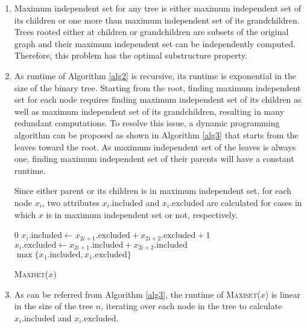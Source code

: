 \begin{enumerate}[label=(\alph*)]
\item Maximum independent set for any tree is either maximum independent set of its children or one more than maximum independent set of its grandchildren.
Trees rooted either at children or grandchildren are subsets of the original graph and their maximum independent set can be independently computed.
Therefore, this problem has the optimal substructure property.

\item As runtime of Algorithm \ref{alg2} is recursive, its runtime is exponential in the size of the binary tree.
Starting from the root, finding maximum independent set for each node requires finding maximum independent set of its children as well as maximum independent set of its grandchildren, resulting in many redundant computations.
To resolve this issue, a dynamic programming algorithm can be proposed as shown in Algorithm \ref{alg3} that starts from the leaves toward the root.
As maximum independent set of the leaves is always one, finding maximum independent set of their parents will have a constant runtime.

Since either parent or its children is in maximum independent set, for each node $x_i$, two attributes $x_i.\text{included}$ and $x_i.\text{excluded}$ are calculated for cases in which $x$ is in maximum independent set or not, respectively.

\begin{algorithm}[H]
\begin{algorithmic}[1]
\State \Return $0$
\EndIf
{}
\State $x_i.\text{included} \leftarrow x_{2i+1}.\text{excluded} + x_{2i+2}.\text{excluded} + 1$
\State $x_i.\text{excluded} \leftarrow x_{2i+1}.\text{included} + x_{2i+2}.\text{included}$
\EndFor
\State \Return $\max\{x_1.\text{included}, x_1.\text{excluded}\}$
\end{algorithmic}
\caption{\textsc{Maxiset}($x$)}\label{alg3}
\end{algorithm}

\item As can be referred from Algorithm \ref{alg3}, the runtime of \textsc{Maxiset($x$)} is linear in the size of the tree $n$, iterating over each node in the tree to calculate $x_i.\text{included}$ and $x_i.\text{excluded}$.
\end{enumerate}
